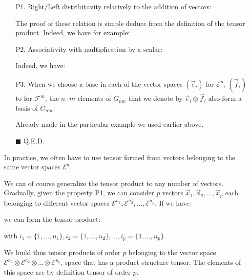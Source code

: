 	\begin{enumerate}
		\item[P1.] Right/Left distribituvity relatively to the addition of vectors:
		
		The proof of these relation is simple deduce from the definition of the tensor product. Indeed, we have for example:
		
		
		\item[P2.] Associativity with multiplication by a scalar:
		
		Indeed, we have:
		
	
		\item[P3.] When we choose a base in each of the vector spaces $(\vec{e}_i)$ for $\mathcal{E}^n$, $(\vec{f}_i)$ to for $\mathcal{F}^m$, the $n\cdot m$ elements of $G_{nm}$ that we denote by $\vec{e}_i \otimes\vec{f}_i$ also form a basis of $G_{nm}$.
		\begin{dem}
			Already made in the particular example we used earlier above.
		\begin{flushright}
			$\blacksquare$  Q.E.D.
		\end{flushright}
		\end{dem}
	\end{enumerate}
	\begin{tcolorbox}[title=Remark,colframe=black,arc=10pt]
	In practice, we often have to use tensor formed from vectors belonging to the same vector spaces $\mathcal{E}^n$.
	\end{tcolorbox}
	We can of course generalize the tensor product to any number of vectors. Gradually, given the property P1, we can consider $p$ vectors $\vec{x}_1,\vec{x}_2,\ldots,\vec{x}_p$ each belonging to different vector spaces $\mathcal{E}^{n_1},\mathcal{E}^{n_2},\ldots,\mathcal{E}^{n_p}$. If we have:
	
	we can form the tensor product:
	
with $i_1=\{1,\ldots,n_1\},i_2=\{1,\ldots,n_2\},\ldots,i_p=\{1,\ldots,n_p\}$.

	We build thus tensor products of order $p$ belonging to the vector space $\mathcal{E}^{n_1}\otimes\mathcal{E}^{n_2}\otimes\ldots \otimes\mathcal{E}^{n_p}$, space that has a product structure tensor. The elements of this space are by definition tensor of order $p$.

